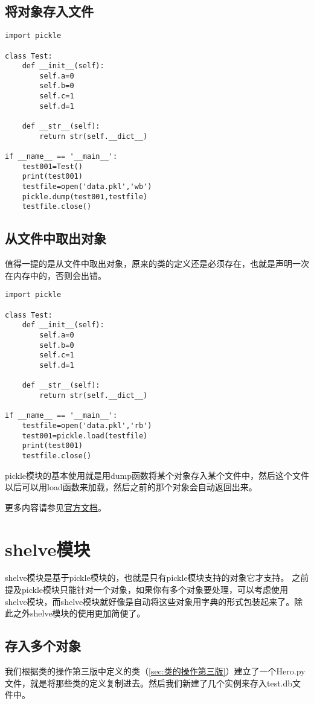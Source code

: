 \documentclass[12pt,oneside]{book}
\begin{document}
\begin{common-format}
\section{将对象存入文件}
\begin{Verbatim}
import pickle

class Test:
    def __init__(self):
        self.a=0
        self.b=0
        self.c=1
        self.d=1

    def __str__(self):
        return str(self.__dict__)

if __name__ == '__main__':
    test001=Test()
    print(test001)
    testfile=open('data.pkl','wb')
    pickle.dump(test001,testfile)
    testfile.close()
\end{Verbatim}




\section{从文件中取出对象}
值得一提的是从文件中取出对象，原来的类的定义还是必须存在，也就是声明一次在内存中的，否则会出错。
\begin{Verbatim}
import pickle

class Test:
    def __init__(self):
        self.a=0
        self.b=0
        self.c=1
        self.d=1

    def __str__(self):
        return str(self.__dict__)

if __name__ == '__main__':
    testfile=open('data.pkl','rb')
    test001=pickle.load(testfile)
    print(test001)
    testfile.close()
\end{Verbatim}

pickle模块的基本使用就是用dump函数将某个对象存入某个文件中，然后这个文件以后可以用load函数来加载，然后之前的那个对象会自动返回出来。

\begin{Large}
更多内容请参见\href{https://docs.python.org/3/library/pickle.html}{官方文档}。
\end{Large}

\chapter{shelve模块}
shelve模块是基于pickle模块的，也就是只有pickle模块支持的对象它才支持。 之前提及pickle模块只能针对一个对象，如果你有多个对象要处理，可以考虑使用shelve模块，而shelve模块就好像是自动将这些对象用字典的形式包装起来了。除此之外shelve模块的使用更加简便了。

\section{存入多个对象}
我们根据类的操作第三版中定义的类（\ref{sec:类的操作第三版}）建立了一个Hero.py文件，就是将那些类的定义复制进去。然后我们新建了几个实例来存入test.db文件中。


\end{common-format}
\end{document}
